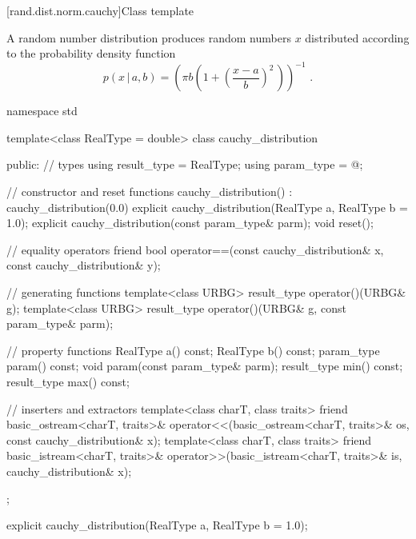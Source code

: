
[rand.dist.norm.cauchy]{Class template }%
%

\pnum
A  random number distribution
produces random numbers $x$
distributed according to
the probability density function%
\[  p(x\,|\,a,b) = \left(\pi b \left(1 + \left(\frac{x-a}{b} \right)^2 \, \right)\right)^{-1} \text{ .} \]

%
%
\begin{codeblock}
namespace std {
  template<class RealType = double>
  class cauchy_distribution {
  public:
    // types
    using result_type = RealType;
    using param_type  = @\unspec@;

    // constructor and reset functions
    cauchy_distribution() : cauchy_distribution(0.0) {}
    explicit cauchy_distribution(RealType a, RealType b = 1.0);
    explicit cauchy_distribution(const param_type& parm);
    void reset();

    // equality operators
    friend bool operator==(const cauchy_distribution& x, const cauchy_distribution& y);

    // generating functions
    template<class URBG>
      result_type operator()(URBG& g);
    template<class URBG>
      result_type operator()(URBG& g, const param_type& parm);

    // property functions
    RealType a() const;
    RealType b() const;
    param_type param() const;
    void param(const param_type& parm);
    result_type min() const;
    result_type max() const;

    // inserters and extractors
    template<class charT, class traits>
      friend basic_ostream<charT, traits>&
        operator<<(basic_ostream<charT, traits>& os, const cauchy_distribution& x);
    template<class charT, class traits>
      friend basic_istream<charT, traits>&
        operator>>(basic_istream<charT, traits>& is, cauchy_distribution& x);
  };
}
\end{codeblock}


%
\begin{itemdecl}
explicit cauchy_distribution(RealType a, RealType b = 1.0);
\end{itemdecl}

